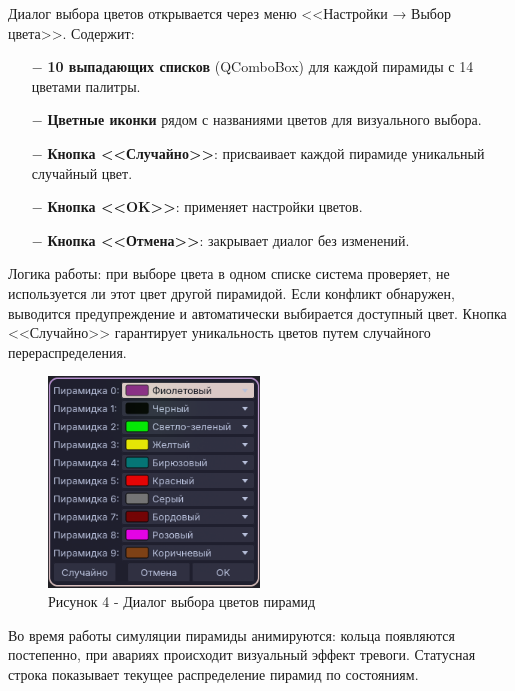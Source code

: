 \documentclass[oneside,a4paper,14pt]{extarticle}
\begin{document}
Диалог выбора цветов открывается через меню <<Настройки → Выбор цвета>>. Содержит:

\begin{itemize}
  \item[$-$] \textbf{10 выпадающих списков} (QComboBox) для каждой пирамиды с 14 цветами палитры.
  \item[$-$] \textbf{Цветные иконки} рядом с названиями цветов для визуального выбора.
  \item[$-$] \textbf{Кнопка <<Случайно>>}: присваивает каждой пирамиде уникальный случайный цвет.
  \item[$-$] \textbf{Кнопка <<OK>>}: применяет настройки цветов.
  \item[$-$] \textbf{Кнопка <<Отмена>>}: закрывает диалог без изменений.
\end{itemize}

Логика работы: при выборе цвета в одном списке система проверяет, не используется ли этот цвет другой пирамидой. Если конфликт обнаружен, выводится предупреждение и автоматически выбирается доступный цвет. Кнопка <<Случайно>> гарантирует уникальность цветов путем случайного перераспределения.

\begin{figure}[H]
  \centering
  \includegraphics[width=0.5\textwidth]{pics/color_dialog.png}
  \caption*{Рисунок 4 - Диалог выбора цветов пирамид}
\end{figure}

\clearpage

Во время работы симуляции пирамиды анимируются: кольца появляются постепенно, при авариях происходит визуальный эффект тревоги. Статусная строка показывает текущее распределение пирамид по состояниям.
\end{document}
